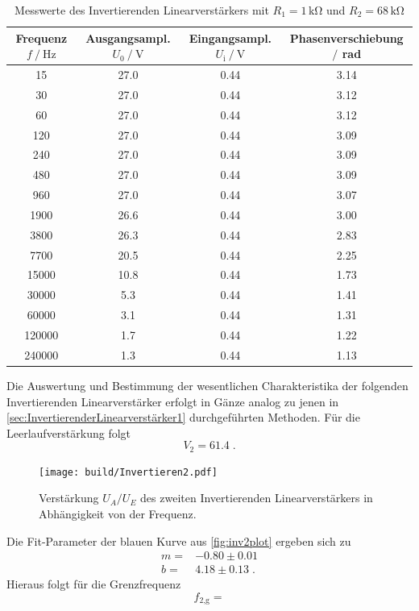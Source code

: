 \begin{table}
    \centering
    \caption{Messwerte des Invertierenden Linearverstärkers mit $R_1=1\,\unit{\kilo\ohm}$ und $R_2=68\,\unit{\kilo\ohm}$}
    \begin{tabular}{c c c c}
        \toprule
        Frequenz $f\mathbin{/}\unit{\hertz}$ & Ausgangsampl. $U_0\mathbin{/}\unit{\volt}$& Eingangsampl. $U_{\text{i}}\mathbin{/}\unit{\volt}$ & Phasenverschiebung $\mathbin{/}$ rad\\
        \midrule
        15&	27.0&	0.44&	3.14\\		    
        30&	27.0&	0.44&	3.12\\		
        60&	27.0&	0.44&	3.12\\		
        120&	27.0&	0.44&	3.09\\		
        240&	27.0&	0.44&	3.09\\		
        480	&27.0&	0.44&	3.09\\		
        960	&27.0&	0.44&	3.07\\		
        1900&	26.6&	0.44&	3.00\\	
        3800& 26.3&	0.44&	2.83\\	
        7700&	20.5&	0.44&	2.25\\	
        15000&	10.8&	0.44&	1.73\\	
        30000&	5.3&	0.44&	1.41	\\	
        60000&	3.1	&0.44&	1.31	\\	
        120000&	1.7	&0.44&	1.22	\\	
        240000&	1.3	&0.44&	1.13	\\
        \bottomrule
    \end{tabular}
    \label{tab:InvAmp2}
\end{table}
Die Auswertung und Bestimmung der wesentlichen Charakteristika der folgenden Invertierenden Linearverstärker erfolgt in Gänze analog zu jenen in \autoref{sec:InvertierenderLinearverstärker1} durchgeführten Methoden.
Für die Leerlaufverstärkung folgt
\begin{equation*}
    V_2= 61.4\; .
\end{equation*}
\begin{figure}
    \centering
    \texttt{[image: build/Invertieren2.pdf]}
    \caption{Verstärkung $U_A/U_E$ des zweiten Invertierenden Linearverstärkers in Abhängigkeit von der Frequenz.}
    \label{fig:inv2plot}
\end{figure}
Die Fit-Parameter der blauen Kurve aus \autoref{fig:inv2plot} ergeben sich zu
\begin{align*}
    m=&-0.80\pm 0.01 \\
    b=& 4.18\pm 0.13\; .
\end{align*}
Hieraus folgt für die Grenzfrequenz
\begin{equation*}
    f_{2\text{,g}}=
\end{equation*}
